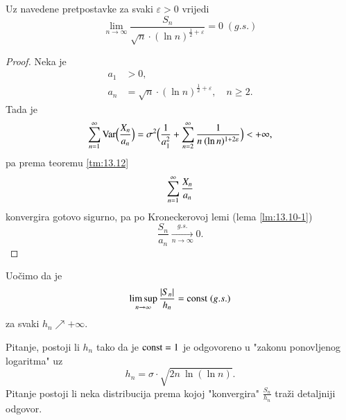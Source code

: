 \begin{prop}    \label{prop:14.11}
    Uz navedene pretpostavke za svaki $\varepsilon > 0$ vrijedi
    \begin{equation*}
        \lim\limits_{n \to \infty} \frac{S_n}{\sqrt{n} \cdot (\ln n)^{\frac{1}{2} + \varepsilon}} = 0 \; (g.s.)
    \end{equation*}
\end{prop}

\begin{proof}
    Neka je
    \begin{equation*}
        \begin{aligned}
            a_1 &> 0,\\
            a_n &= \sqrt{n} \cdot (\ln n)^{\frac{1}{2} + \varepsilon}, \quad n \geq 2.
        \end{aligned}
    \end{equation*}
    Tada je
    \begin{equation*}
        \sum\limits_{n = 1}^{\infty} \mathrm{Var} \Big( \frac{X_n}{a_n} \Big) = \sigma^2 \Big( \frac{1}{a_1^2} + \sum\limits_{n = 2}^{\infty} \frac{1}{n \: (\ln n)^{1 + 2 \varepsilon}} \Big) < +\infty,
    \end{equation*}
    pa prema teoremu \ref{tm:13.12}
    \begin{equation*}
        \sum\limits_{n = 1}^{\infty} \frac{X_n}{a_n}
    \end{equation*}
    konvergira gotovo sigurno, pa po Kroneckerovoj lemi (lema \ref{lm:13.10-1})
    \begin{equation*}
        \frac{S_n}{a_n} \xrightarrow[n \to \infty]{g.s.} 0.
    \end{equation*}
\end{proof}

Uo\v cimo da je
\begin{equation*}
    \limsup\limits_{n \to \infty} \frac{|S_n|}{h_n} = \mathrm{const} \; (g.s.)
\end{equation*}
za svaki $h_n \nearrow +\infty$.

Pitanje, postoji li $h_n$ tako da je $\mathrm{const} = 1$ je odgovoreno u "zakonu ponovljenog logaritma" uz
\begin{equation*}
    h_n = \sigma \cdot \sqrt{2n \: \ln (\ln n)}.
\end{equation*}
Pitanje postoji li neka distribucija prema kojoj "konvergira" $\frac{S_n}{h_n}$ tra\v zi detaljniji odgovor.